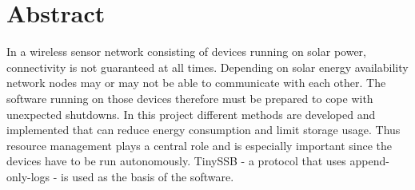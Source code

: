 \chapter{Abstract}

In a wireless sensor network consisting of devices running on solar power, connectivity is not guaranteed at all times. Depending on solar energy availability network nodes may or may not be able to communicate with each other. The software running on those devices therefore must be prepared to cope with unexpected shutdowns. In this project different methods are developed and implemented that can reduce energy consumption and limit storage usage. Thus resource management plays a central role and is especially important since the devices have to be run autonomously. TinySSB - a protocol that uses append-only-logs - is used as the basis of the software.